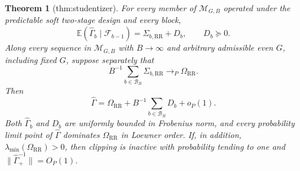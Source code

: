 \documentclass{article}
\newtheorem{theorem}{Theorem}
\begin{document}
\begin{theorem}[thm:studentizer]\label{thm:studentizer}
For every member of \(\mathcal M_{G,B}\) operated under the predictable soft two-stage design and every block,
\[
\mathbb E(\widehat\Gamma_b\mid\mathcal F_{b-1})=\Sigma_{b,\mathrm{RR}}+D_b,
\qquad D_b\succeq0.
\]
Along every sequence in \(\mathcal M_{G,B}\) with \(B\to\infty\) and arbitrary admissible even \(G\), including fixed \(G\), suppose separately that
\[
B^{-1}\sum_{b\in\mathcal B_B}\Sigma_{b,\mathrm{RR}}\to_P\Omega_{\mathrm{RR}}.
\]
Then
\[
\widehat\Gamma=\Omega_{\mathrm{RR}}+B^{-1}\sum_{b\in\mathcal B_B}D_b+o_P(1).
\]
Both \(\widehat\Gamma_b\) and \(D_b\) are uniformly bounded in Frobenius norm, and every probability limit point of \(\widehat\Gamma\) dominates \(\Omega_{\mathrm{RR}}\) in Loewner order.  If, in addition, \(\lambda_{\min}(\Omega_{\mathrm{RR}})>0\), then clipping is inactive with probability tending to one and \(\|\widehat\Gamma_+^{-1}\|=O_P(1)\).
\end{theorem}
\end{document}
